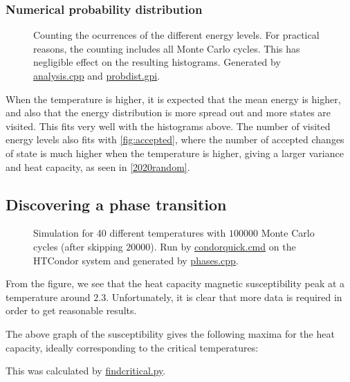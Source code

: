 \documentclass[12pt,english,a4paper]{article}
\newcommand{\program}[1]{\href{https://github.com/anjohan/Offentlig/blob/master/FYS3150/Oblig4/#1}{#1}}
\begin{document}
\subsubsection{Numerical probability distribution}
\begin{figure}[H]
\centering

\caption{Counting the ocurrences of the different energy levels. For practical reasons, the counting includes all Monte Carlo cycles. This has negligible effect on the resulting histograms. Generated by \program{analysis.cpp} and \program{probdist.gpi}.}
\end{figure}
When the temperature is higher, it is expected that the mean energy is higher, and also that the energy distribution is more spread out and more states are visited. This fits very well with the histograms above. The number of visited energy levels also fits with \vref{fig:accepted}, where the number of accepted changes of state is much higher when the temperature is higher, giving a larger variance and heat capacity, as seen in \vref{2020random}.


\subsection{Discovering a phase transition}\label{phases}

\begin{figure}[H]
\centering

\caption{Simulation for 40 different temperatures with \(\num{100000}\) Monte Carlo cycles (after skipping \(\num{20000}\)). Run by \program{condorquick.cmd} on the HTCondor system and generated by \program{phases.cpp}.}
\end{figure}
From the figure, we see that the heat capacity magnetic susceptibility peak at a temperature around \(\num{2.3}\). Unfortunately, it is clear that more data is required in order to get reasonable results.

The above graph of the susceptibility gives the following maxima for the heat capacity, ideally corresponding to the critical temperatures:

This was calculated by \program{findcritical.py}.
\end{document}
